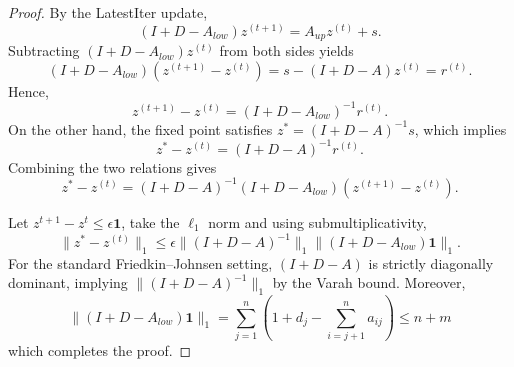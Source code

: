\documentclass[sigconf,review, nonacm]{acmart}
\newcommand\rr{\boldsymbol{\mathit{r}}}
\newcommand\s{\boldsymbol{\mathit{s}}}
\newcommand\zz{\boldsymbol{\mathit{z}}}
\renewcommand\AA{\boldsymbol{\mathit{A}}}
\newcommand\DD{\boldsymbol{\mathit{D}}}
\newcommand\II{\boldsymbol{\mathit{I}}}
\begin{document}
\begin{proof}
	By the LatestIter update,
	\[
	(\II+\DD-\AA_{low})\zz^{(t+1)}=\AA_{up}\zz^{(t)}+\s.
	\]
	Subtracting $(\II+\DD-\AA_{low})\zz^{(t)}$ from both sides yields
	\[
	(\II+\DD-\AA_{low})(\zz^{(t+1)}-\zz^{(t)})
	=
	\s-(\II+\DD-\AA)\zz^{(t)}
	=
	\rr^{(t)}.
	\]
	Hence,
	\[
	\zz^{(t+1)}-\zz^{(t)}=(\II+\DD-\AA_{low})^{-1}\rr^{(t)}.
	\]
	On the other hand, the fixed point satisfies
	$\zz^*=(\II+\DD-\AA)^{-1}\s$, which implies
	\[
	\zz^*-\zz^{(t)}=(\II+\DD-\AA)^{-1}\rr^{(t)}.
	\]
	Combining the two relations gives
	\[
	\zz^*-\zz^{(t)}
	=
	(\II+\DD-\AA)^{-1}(\II+\DD-\AA_{low})(\zz^{(t+1)}-\zz^{(t)}).
	\]
	
	
	Let $\zz^{t+1}-\zz^{t}\leq\epsilon\mathbf{1}$, take the $\ell_{1}$ norm and using submultiplicativity,
	\[
	\|\zz^*-\zz^{(t)}\|_1
	\le
	\epsilon \|(\II+\DD-\AA)^{-1}\|_1
	\|(\II+\DD-\AA_{low})\mathbf{1}\|_1.
	\]
	For the standard Friedkin--Johnsen setting, $(\II+\DD-\AA)$ is strictly diagonally
	dominant, implying $\|(\II+\DD-\AA)^{-1}\|_1$ by the Varah bound.
	Moreover,
	\[
	\|(\II+\DD-\AA_{low})\mathbf{1}\|_{1}
	=\sum_{j=1}^{n}(1+d_j-\sum_{i=j+1}^n a_{ij}) \leq n+m
	\]
	which completes the proof.
\end{proof}


%
\end{document}
